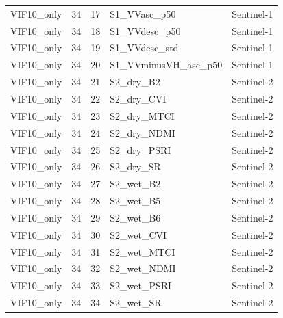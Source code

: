 \begin{tabular}{lrrll}
VIF10_only & 34 & 17 & S1_VVasc_p50 & Sentinel-1 \\
VIF10_only & 34 & 18 & S1_VVdesc_p50 & Sentinel-1 \\
VIF10_only & 34 & 19 & S1_VVdesc_std & Sentinel-1 \\
VIF10_only & 34 & 20 & S1_VVminusVH_asc_p50 & Sentinel-1 \\
VIF10_only & 34 & 21 & S2_dry_B2 & Sentinel-2 \\
VIF10_only & 34 & 22 & S2_dry_CVI & Sentinel-2 \\
VIF10_only & 34 & 23 & S2_dry_MTCI & Sentinel-2 \\
VIF10_only & 34 & 24 & S2_dry_NDMI & Sentinel-2 \\
VIF10_only & 34 & 25 & S2_dry_PSRI & Sentinel-2 \\
VIF10_only & 34 & 26 & S2_dry_SR & Sentinel-2 \\
VIF10_only & 34 & 27 & S2_wet_B2 & Sentinel-2 \\
VIF10_only & 34 & 28 & S2_wet_B5 & Sentinel-2 \\
VIF10_only & 34 & 29 & S2_wet_B6 & Sentinel-2 \\
VIF10_only & 34 & 30 & S2_wet_CVI & Sentinel-2 \\
VIF10_only & 34 & 31 & S2_wet_MTCI & Sentinel-2 \\
VIF10_only & 34 & 32 & S2_wet_NDMI & Sentinel-2 \\
VIF10_only & 34 & 33 & S2_wet_PSRI & Sentinel-2 \\
VIF10_only & 34 & 34 & S2_wet_SR & Sentinel-2 \\
\bottomrule
\end{tabular}
